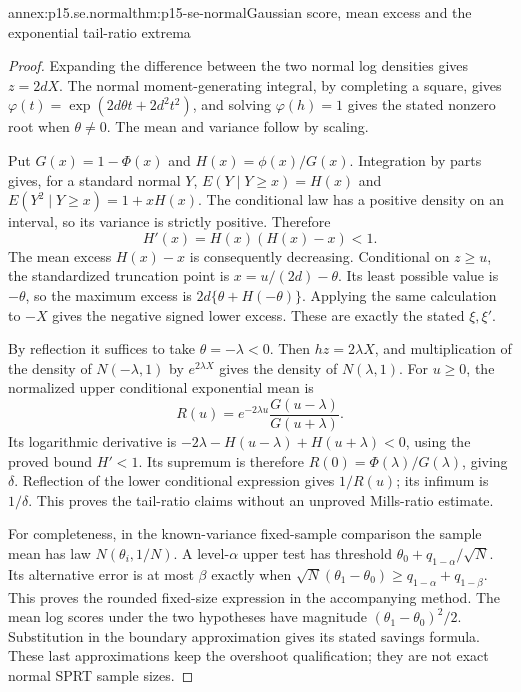 \begin{annexitem}{annex:p15.se.normal}{thm:p15-se-normal}{Gaussian score, mean excess and the exponential tail-ratio extrema}
\begin{proof}
Expanding the difference between the two normal log densities gives
\(z=2dX\). The normal moment-generating integral, by completing a
square, gives \(\varphi(t)=\exp(2d\theta t+2d^2t^2)\), and
solving \(\varphi(h)=1\) gives the stated nonzero root when
\(\theta\ne0\). The mean and variance follow by scaling.

Put \(G(x)=1-\Phi(x)\) and \(H(x)=\phi(x)/G(x)\).
Integration by parts gives, for a standard normal \(Y\),
\(E(Y\mid Y\geq x)=H(x)\) and
\(E(Y^2\mid Y\geq x)=1+xH(x)\). The conditional law has a positive
density on an interval, so its variance is strictly positive. Therefore
\[
 H'(x)=H(x)(H(x)-x)<1.
\]
The mean excess \(H(x)-x\) is consequently decreasing. Conditional
on \(z\geq u\), the standardized truncation point is
\(x=u/(2d)-\theta\). Its least possible value is \(-\theta\),
so the maximum excess is \(2d\{\theta+H(-\theta)\}\).
Applying the same calculation to \(-X\) gives the negative signed
lower excess. These are exactly the stated \(\xi,\xi'\).

By reflection it suffices to take \(\theta=-\lambda<0\).
Then \(hz=2\lambda X\), and multiplication of the density of
\(N(-\lambda,1)\) by \(e^{2\lambda X}\) gives the density of
\(N(\lambda,1)\). For \(u\geq0\), the normalized upper conditional
exponential mean is
\[
 R(u)=e^{-2\lambda u}\frac{G(u-\lambda)}{G(u+\lambda)}.
\]
Its logarithmic derivative is
\(-2\lambda-H(u-\lambda)+H(u+\lambda)<0\), using the proved
bound \(H'<1\). Its supremum is therefore
\(R(0)=\Phi(\lambda)/G(\lambda)\), giving \(\delta\).
Reflection of the lower conditional expression gives \(1/R(u)\);
its infimum is \(1/\delta\). This proves the tail-ratio claims
without an unproved Mills-ratio estimate.

For completeness, in the known-variance fixed-sample comparison the
sample mean has law \(N(\theta_i,1/N)\). A level-\(\alpha\)
upper test has threshold \(\theta_0+q_{1-\alpha}/\sqrt N\).
Its alternative error is at most \(\beta\) exactly when
\(\sqrt N(\theta_1-\theta_0)\geq q_{1-\alpha}+q_{1-\beta}\).
This proves the rounded fixed-size expression in the accompanying method.
The mean log scores under the two hypotheses have magnitude
\((\theta_1-\theta_0)^2/2\). Substitution in the boundary approximation
gives its stated savings formula. These last approximations keep the
overshoot qualification; they are not exact normal SPRT sample sizes.
\end{proof}
\end{annexitem}

